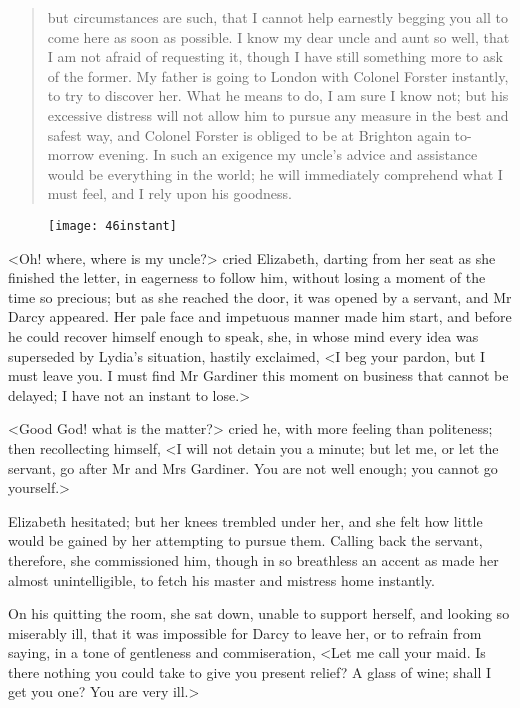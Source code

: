 \begin{quotation}
but circumstances are such, that I cannot help earnestly begging you all to come here as soon as possible. I know my dear uncle and aunt so well, that I am not afraid of requesting it, though I have still something more to ask of the former. My father is going to London with Colonel Forster instantly, to try to discover her. What he means to do, I am sure I know not; but his excessive distress will not allow him to pursue any measure in the best and safest way, and Colonel Forster is obliged to be at Brighton again to-morrow evening. In such an exigence my uncle's advice and assistance would be everything in the world; he will immediately comprehend what I must feel, and I rely upon his goodness.
\end{quotation}


\begin{figure}[tbh]
\centering
\texttt{[image: 46instant]}
\end{figure}

<Oh! where, where is my uncle?> cried Elizabeth, darting from her seat as she finished the letter, in eagerness to follow him, without losing a moment of the time so precious; but as she reached the door, it was opened by a servant, and Mr Darcy appeared. Her pale face and impetuous manner made him start, and before he could recover himself enough to speak, she, in whose mind every idea was superseded by Lydia's situation, hastily exclaimed, <I beg your pardon, but I must leave you. I must find Mr Gardiner this moment on business that cannot be delayed; I have not an instant to lose.>

<Good God! what is the matter?> cried he, with more feeling than politeness; then recollecting himself, <I will not detain you a minute; but let me, or let the servant, go after Mr and Mrs Gardiner. You are not well enough; you cannot go yourself.>

Elizabeth hesitated; but her knees trembled under her, and she felt how little would be gained by her attempting to pursue them. Calling back the servant, therefore, she commissioned him, though in so breathless an accent as made her almost unintelligible, to fetch his master and mistress home instantly.

On his quitting the room, she sat down, unable to support herself, and looking so miserably ill, that it was impossible for Darcy to leave her, or to refrain from saying, in a tone of gentleness and commiseration, <Let me call your maid. Is there nothing you could take to give you present relief? A glass of wine; shall I get you one? You are very ill.>

